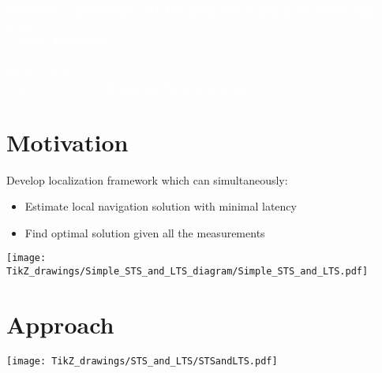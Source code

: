 \documentclass[%
    fourtothree=true, %
    DepLogo=true     %
    ]{ETHpres}
\newcommand*{\ETHtitle}{Closed-loop multi-sensor SLAM using factor graphs for fixed-wing UAV.}
\newcommand*{\ETHauthor}{Adam Radomski}
\begin{document}
\ETHtitelbild\textcolor{white}{\large\textbf{\ETHtitle}}\\~\newline\hspace{6mm}\normalsize%
\textcolor{white}{
\textbf{\ETHauthor}\\ \\
Master Thesis\\
Supervised by Timo Hinzmann, Thomas Schneider}\\


\ETHslide
\section*{Motivation}
Develop localization framework which can simultaneously:
\begin{itemize}
	\item[\ETHitem] Estimate local navigation solution with minimal latency
	\item[\ETHitem] Find optimal solution given all the measurements
\end{itemize}

\begin{center}
\texttt{[image: TikZ\_drawings/Simple\_STS\_and\_LTS\_diagram/Simple\_STS\_and\_LTS.pdf]}\\
\end{center}

\clearpage

\ETHslide
\section*{Approach}
\begin{center}
\texttt{[image: TikZ\_drawings/STS\_and\_LTS/STSandLTS.pdf]}\\
\end{center}


%

\clearpage

\ETHslide
\end{document}
